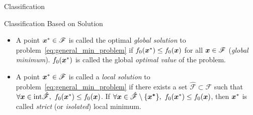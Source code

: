 \begin{boxnote}{Classification}
\begin{note}{Classification Based on Solution}
    \begin{itemize}
        \item A point \(\boldsymbol{x}^* \in \mathscr{F}\) is called the optimal \emph{global solution} to problem~\ref{eq:general_min_problem} if \(f_0(\boldsymbol{x}^*) \le f_0(\boldsymbol{x})\) for all \(\boldsymbol{x} \in \mathscr{F}\) (\textit{global minimum}). \(f_0(\boldsymbol{x}^*)\) is called the global \emph{optimal value} of the problem.
        \item A point \(\boldsymbol{x}^* \in \mathscr{F}\) is called a \emph{local solution} to problem~\ref{eq:general_min_problem} if there exists a set \(\hat{\mathscr{F}} \subset \mathscr{F}\) such that \(\forall \boldsymbol{x} \in \mathrm{int}\hat{\mathscr{F}}, ~f_0(\boldsymbol{x}^*) \le f_0(\boldsymbol{x})\). If \(\forall \boldsymbol{x} \in \hat{\mathscr{F}} \setminus \{\boldsymbol{{x}^*}\}, ~f_0(\boldsymbol{x}^*) \le f_0(\boldsymbol{x})\), then \(\boldsymbol{x}^*\) is called \emph{strict} (or \emph{isolated}) local minimum.
    \end{itemize}
\end{note}

\end{boxnote}